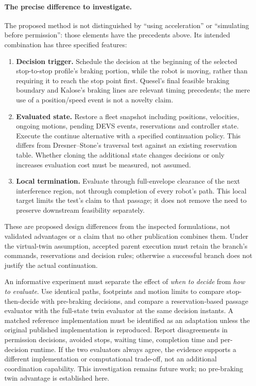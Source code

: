\documentclass[11pt,a4paper]{article}
\theoremstyle{remark}
\begin{document}
\paragraph{The precise difference to investigate.}
The proposed method is not distinguished by ``using acceleration'' or
``simulating before permission'': those elements have the precedents above.
Its intended combination has three specified features:
\begin{enumerate}
\item \textbf{Decision trigger.} Schedule the decision at the beginning of the
selected stop-to-stop profile's braking portion, while the robot is moving,
rather than requiring it to reach the stop point first. Quesel's final feasible
braking boundary and Kalose's braking lines are relevant timing precedents;
the mere use of a position/speed event is not a novelty claim.
\item \textbf{Evaluated state.} Restore a fleet snapshot including positions,
velocities, ongoing motions, pending DEVS events, reservations and controller
state. Execute the continue alternative with a specified continuation policy.
This differs from Dresner--Stone's traversal test against an existing
reservation table. Whether cloning the additional state changes decisions or
only increases evaluation cost must be measured, not assumed.
\item \textbf{Local termination.} Evaluate through full-envelope clearance of
the next interference region, not through completion of every robot's path.
This local target limits the test's claim to that passage; it does not remove
the need to preserve downstream feasibility separately.
\end{enumerate}
These are proposed design differences from the inspected formulations,
not validated advantages or a claim that no other publication combines them.
Under the virtual-twin assumption, accepted parent execution must retain the
branch's commands, reservations and decision rules; otherwise a successful
branch does not justify the actual continuation.

An informative experiment must separate the effect of \emph{when to decide}
from \emph{how to evaluate}. Use identical paths, footprints and motion limits
to compare stop-then-decide with pre-braking decisions, and compare a
reservation-based passage evaluator with the full-state twin evaluator at
the same decision instants. A matched reference implementation must be
identified as an adaptation unless the original published implementation is
reproduced. Report disagreements in permission decisions, avoided stops,
waiting time, completion time and per-decision runtime. If the two evaluators
always agree, the evidence supports a different implementation or computational
trade-off, not an additional coordination capability. This investigation
remains future work; no pre-braking twin advantage is established here.
\end{document}
